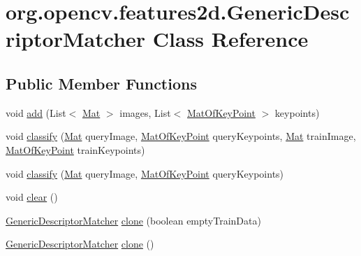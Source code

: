 \hypertarget{classorg_1_1opencv_1_1features2d_1_1_generic_descriptor_matcher}{}\section{org.\+opencv.\+features2d.\+Generic\+Descriptor\+Matcher Class Reference}
\label{classorg_1_1opencv_1_1features2d_1_1_generic_descriptor_matcher}
\subsection*{Public Member Functions}
\begin{DoxyCompactItemize}
\item 
void \mbox{\hyperlink{classorg_1_1opencv_1_1features2d_1_1_generic_descriptor_matcher_ad0e0a234636c370c74fdd4086ac5c716}{add}} (List$<$ \mbox{\hyperlink{classorg_1_1opencv_1_1core_1_1_mat}{Mat}} $>$ images, List$<$ \mbox{\hyperlink{classorg_1_1opencv_1_1core_1_1_mat_of_key_point}{Mat\+Of\+Key\+Point}} $>$ keypoints)
\item 
void \mbox{\hyperlink{classorg_1_1opencv_1_1features2d_1_1_generic_descriptor_matcher_aad6739fde6c8aea642a80de25d498ce1}{classify}} (\mbox{\hyperlink{classorg_1_1opencv_1_1core_1_1_mat}{Mat}} query\+Image, \mbox{\hyperlink{classorg_1_1opencv_1_1core_1_1_mat_of_key_point}{Mat\+Of\+Key\+Point}} query\+Keypoints, \mbox{\hyperlink{classorg_1_1opencv_1_1core_1_1_mat}{Mat}} train\+Image, \mbox{\hyperlink{classorg_1_1opencv_1_1core_1_1_mat_of_key_point}{Mat\+Of\+Key\+Point}} train\+Keypoints)
\item 
void \mbox{\hyperlink{classorg_1_1opencv_1_1features2d_1_1_generic_descriptor_matcher_aa5fdedf03124f2831e85ed0780deb8c0}{classify}} (\mbox{\hyperlink{classorg_1_1opencv_1_1core_1_1_mat}{Mat}} query\+Image, \mbox{\hyperlink{classorg_1_1opencv_1_1core_1_1_mat_of_key_point}{Mat\+Of\+Key\+Point}} query\+Keypoints)
\item 
void \mbox{\hyperlink{classorg_1_1opencv_1_1features2d_1_1_generic_descriptor_matcher_aa5902c8aca6b21e07f0ea6709b632530}{clear}} ()
\item 
\mbox{\hyperlink{classorg_1_1opencv_1_1features2d_1_1_generic_descriptor_matcher}{Generic\+Descriptor\+Matcher}} \mbox{\hyperlink{classorg_1_1opencv_1_1features2d_1_1_generic_descriptor_matcher_aacf1be1b878d2532bd04685e46a6d25e}{clone}} (boolean empty\+Train\+Data)
\item 
\mbox{\hyperlink{classorg_1_1opencv_1_1features2d_1_1_generic_descriptor_matcher}{Generic\+Descriptor\+Matcher}} \mbox{\hyperlink{classorg_1_1opencv_1_1features2d_1_1_generic_descriptor_matcher_a007e317ad3a73e1d0df4809d614d7b72}{clone}} ()

\end{DoxyCompactItemize}

